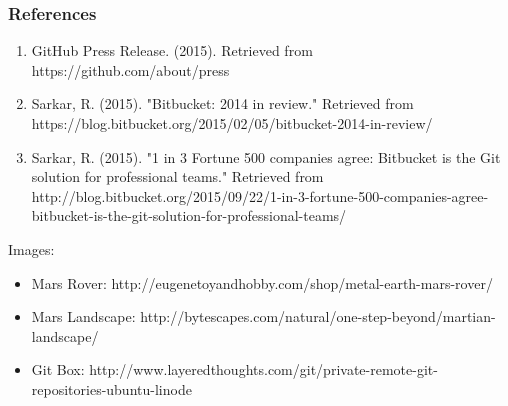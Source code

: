 \begin{frame}
    \centering
    \frametitle{References}
	\fontsize{9}{7.2}
	\begin{enumerate}
		\item GitHub Press Release.  (2015).  Retrieved from https://github.com/about/press
		\item Sarkar, R.  (2015).  "Bitbucket: 2014 in review."  Retrieved from https://blog.bitbucket.org/2015/02/05/bitbucket-2014-in-review/
		\item Sarkar, R.  (2015).  "1 in 3 Fortune 500 companies agree: Bitbucket is the Git solution for professional teams."  Retrieved from http://blog.bitbucket.org/2015/09/22/1-in-3-fortune-500-companies-agree-bitbucket-is-the-git-solution-for-professional-teams/
	\end{enumerate}	
	Images:
	\begin{itemize}
		\item Mars Rover: http://eugenetoyandhobby.com/shop/metal-earth-mars-rover/
		\item Mars Landscape: http://bytescapes.com/natural/one-step-beyond/martian-landscape/
		\item Git Box: http://www.layeredthoughts.com/git/private-remote-git-repositories-ubuntu-linode
	\end{itemize}
\end{frame}